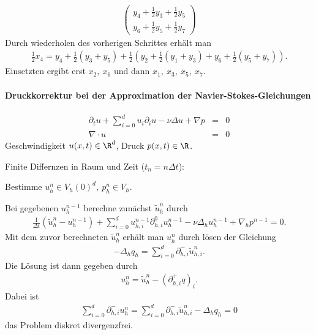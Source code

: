 \begin{Beispiel}
\begin{eqnarray*}
\begin{pmatrix}
            y_4 + \frac{1}{2} y_3 + \frac{1}{2} y_5 \\
            y_6 + \frac{1}{2} y_5 + \frac{1}{2} y_7
        \end{pmatrix}
    \end{eqnarray*}
    Durch wiederholen des vorherigen Schrittes erhält man
    \begin{eqnarray*}
          \frac{1}{2} x_4
        = y_4 + \frac{1}{2} (y_3 + y_5) + \frac{1}{2} \left(y_2 + \frac{1}{2}
          (y_1 + y_3) + y_6 + \frac{1}{2} (y_5 + y_7)\right).
    \end{eqnarray*}
    Einsetzten ergibt erst $x_2, \ x_6$ und dann $x_1, \ x_3, \ x_5, \ x_7$.
\end{Beispiel}



\paragraph{Druckkorrektur bei der Approximation der Navier-Stokes-Gleichungen}



\begin{eqnarray*}
    \partial_t u + \sum_{i=0}^d u_i \partial_i u -\nu \Delta u + \nabla p &=& 0
    \\
    \nabla \cdot u &=& 0
\end{eqnarray*}
Geschwindigkeit $u(x,t) \in \R^d$, Druck $p(x,t) \in \R$.

Finite Differnzen in Raum und Zeit ($t_n = n \Delta t$):

Bestimme $u_h^n \in V_h(0)^d, \ p_h^n \in V_h$.

Bei gegebenen $u_h^{n-1}$ berechne zunächst $\tilde u_h^n$ durch
\begin{eqnarray*}
    \frac{1}{\Delta t} (\tilde u_h^n - u_h^{n-1}) + \sum_{i=0}^d u_{h,i}^{n-1}
    \partial_{h,i}^0 u_h^{n-1} - \nu \Delta_h u_h^{n-1} + \nabla_h p^{n-1} = 0.
\end{eqnarray*}
Mit dem zuvor berechneten $\tilde u_h^n$ erhält man $u_h^n$ durch lösen der
Gleichung
\begin{eqnarray*}
    -\Delta_h q_h = \sum_{i=0}^d \partial_{h,i}^- \tilde u_{h,i}^n.
\end{eqnarray*}
Die Lösung ist dann gegeben durch
\begin{eqnarray*}
    u_h^n = \tilde u_h^n - (\partial_{h,i}^+ q)_i.
\end{eqnarray*}
Dabei ist
\begin{eqnarray*}
    \sum_{i=0}^d \partial_{h,i}^- u_h^n = \sum_{i=0}^d \partial_{h,i}^-
    \tilde u_{h,i}^n - \Delta_h q_h = 0
\end{eqnarray*}
das Problem diskret divergenzfrei.



